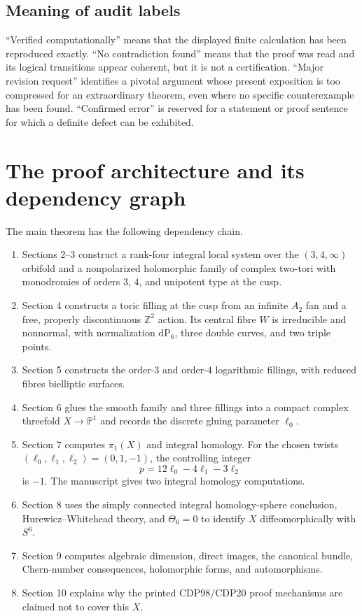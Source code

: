 \documentclass[
  10pt,
  letterpaper,
]{article}
\providecommand{\tightlist}{%
  \setlength{\itemsep}{0pt}\setlength{\parskip}{0pt}}
\newcommand{\Z}{\mathbb Z}
\newcommand{\Pone}{\mathbb P^1}
\newcommand{\dP}{\mathrm{dP}}
\begin{document}
\subsection{Meaning of audit labels}\label{meaning-of-audit-labels}

``Verified computationally'' means that the displayed finite calculation
has been reproduced exactly. ``No contradiction found'' means that the
proof was read and its logical transitions appear coherent, but it is
not a certification. ``Major revision request'' identifies a pivotal
argument whose present exposition is too compressed for an extraordinary
theorem, even where no specific counterexample has been found.
``Confirmed error'' is reserved for a statement or proof sentence for
which a definite defect can be exhibited.

\section{The proof architecture and its dependency
graph}\label{the-proof-architecture-and-its-dependency-graph}

The main theorem has the following dependency chain.

\begin{enumerate}
\def\labelenumi{\arabic{enumi}.}
\tightlist
\item
  Sections 2--3 construct a rank-four integral local system over the
  \((3,4,\infty)\) orbifold and a nonpolarized holomorphic family of
  complex two-tori with monodromies of orders \(3\), \(4\), and
  unipotent type at the cusp.
\item
  Section 4 constructs a toric filling at the cusp from an infinite
  \(A_2\) fan and a free, properly discontinuous \(\Z^2\) action. Its
  central fibre \(W\) is irreducible and nonnormal, with normalization
  \(\dP_6\), three double curves, and two triple points.
\item
  Section 5 constructs the order-\(3\) and order-\(4\) logarithmic
  fillings, with reduced fibres bielliptic surfaces.
\item
  Section 6 glues the smooth family and three fillings into a compact
  complex threefold \(X\to\Pone\) and records the discrete gluing
  parameter \(\ell_0\).
\item
  Section 7 computes \(\pi_1(X)\) and integral homology. For the chosen
  twists \((\ell_0,\ell_1,\ell_2)=(0,1,-1)\), the controlling integer \[
  p=12\ell_0-4\ell_1-3\ell_2
  \] is \(-1\). The manuscript gives two integral homology computations.
\item
  Section 8 uses the simply connected integral homology-sphere
  conclusion, Hurewicz--Whitehead theory, and \(\Theta_6=0\) to identify
  \(X\) diffeomorphically with \(S^6\).
\item
  Section 9 computes algebraic dimension, direct images, the canonical
  bundle, Chern-number consequences, holomorphic forms, and
  automorphisms.
\item
  Section 10 explains why the printed CDP98/CDP20 proof mechanisms are
  claimed not to cover this \(X\).
\end{enumerate}
\end{document}
